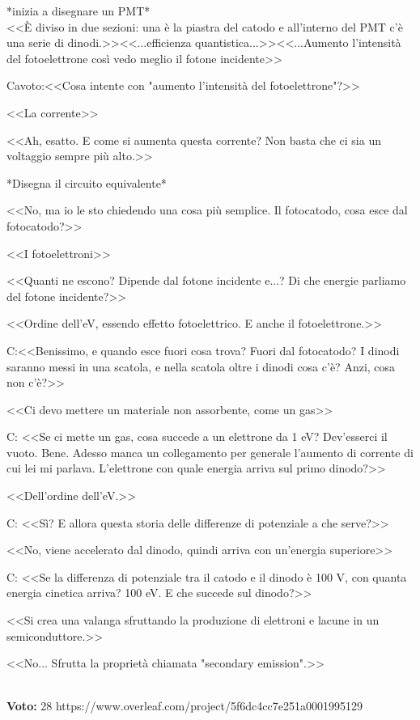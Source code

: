 \documentclass[../main.tex]{subfiles}
\begin{document}
\begin{enumerate}
{\begin{flushright}
        *inizia a disegnare un PMT* \\<<È diviso in due sezioni: una è la piastra del catodo e all'interno del PMT c'è una serie di dinodi.>><<...efficienza quantistica...>><<...Aumento l'intensità del fotoelettrone così vedo meglio il fotone incidente>>
        \end{flushright}
        Cavoto:<<Cosa intente con "aumento l'intensità del fotoelettrone"?>>
        \begin{flushright}
        <<La corrente>>
        \end{flushright}
        <<Ah, esatto. E come si aumenta questa corrente? Non basta che ci sia un voltaggio sempre più alto.>>
        \begin{flushright}
        *Disegna il circuito equivalente*
        \end{flushright}
        <<No, ma io le sto chiedendo una cosa più semplice. Il fotocatodo, cosa esce dal fotocatodo?>>
        \begin{flushright}
        <<I fotoelettroni>>
        \end{flushright}
        <<Quanti ne escono? Dipende dal fotone incidente e...? Di che energie parliamo del fotone incidente?>>
        \begin{flushright}
        <<Ordine dell'eV, essendo effetto fotoelettrico. E anche il fotoelettrone.>>
        \end{flushright}
        C:<<Benissimo, e quando esce fuori cosa trova? Fuori dal fotocatodo? I dinodi saranno messi in una scatola, e nella scatola oltre i dinodi cosa c'è? Anzi, cosa non c'è?>>
        \begin{flushright}
        <<Ci devo mettere un materiale non assorbente, come un gas>>
        \end{flushright}
        C: <<Se ci mette un gas, cosa succede a un elettrone da 1 eV? Dev'esserci il vuoto. Bene. Adesso manca un collegamento per generale l'aumento di corrente di cui lei mi parlava. L'elettrone con quale energia arriva sul primo dinodo?>>
        \begin{flushright}
        <<Dell'ordine dell'eV.>>
        \end{flushright}
        C: <<Sì? E allora questa storia delle differenze di potenziale a che serve?>>
        \begin{flushright}
        <<No, viene accelerato dal dinodo, quindi arriva con un'energia superiore>>
        \end{flushright}
        C: <<Se la differenza di potenziale tra il catodo e il dinodo è 100 V, con quanta energia cinetica arriva? 100 eV. E che succede sul dinodo?>>
        \begin{flushright}
        <<Si crea una valanga sfruttando la produzione di elettroni e lacune in un semiconduttore.>>
        \end{flushright}
        <<No... Sfrutta la proprietà chiamata "secondary emission".>>
        }\\
        \textbf{Voto:} 28 https://www.overleaf.com/project/5f6dc4cc7e251a0001995129
    \end{enumerate}
\end{document}
